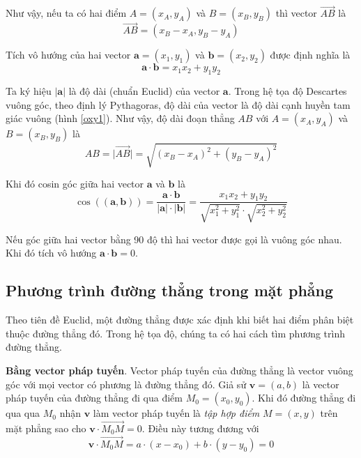 Như vậy, nếu ta có hai điểm $A = (x_A, y_A)$ và $B = (x_B, y_B)$ thì vector $\overrightarrow{AB}$ là
\begin{equation}
	\overrightarrow{AB} = (x_B - x_A, y_B - y_A)
\end{equation}

Tích vô hướng của hai vector $\bm{a} = (x_1, y_1)$ và $\bm{b} = (x_2, y_2)$ được định nghĩa là
\begin{equation}
	\bm{a} \cdot \bm{b} = x_1 x_2 + y_1 y_2
\end{equation}

Ta ký hiệu $\lvert \bm{a} \rvert$ là độ dài (chuẩn Euclid) của vector $\bm{a}$. Trong hệ tọa độ Descartes vuông góc, theo định lý Pythagoras, độ dài của vector là độ dài cạnh huyền tam giác vuông (hình \ref{oxy1}). Như vậy, độ dài đoạn thẳng $AB$ với $A = (x_A, y_A)$ và $B = (x_B, y_B)$ là
\begin{equation}
	AB = \lvert \overrightarrow{AB} \rvert = \sqrt{(x_B - x_A)^2 + (y_B - y_A)^2}
\end{equation}

Khi đó cosin góc giữa hai vector $\bm{a}$ và $\bm{b}$ là
\begin{equation}
	\cos ((\bm{a}, \bm{b})) = \frac{\bm{a} \cdot \bm{b}}{\lvert \bm{a} \rvert \cdot \lvert \bm{b} \rvert} = \frac{x_1 x_2 + y_1 y_2}{\sqrt{x_1^2 + y_1^2} \cdot \sqrt{x_2^2 + y_2^2}}
\end{equation}

Nếu góc giữa hai vector bằng 90 độ thì hai vector được gọi là vuông góc nhau. Khi đó tích vô hướng $\bm{a} \cdot \bm{b} = 0$.

\subsection{Phương trình đường thẳng trong mặt phẳng}

Theo tiên đề Euclid, một đường thẳng được xác định khi biết hai điểm phân biệt thuộc đường thẳng đó. Trong hệ tọa độ, chúng ta có hai cách tìm phương trình đường thẳng.

\textbf{Bằng vector pháp tuyến}. Vector pháp tuyến của đường thẳng là vector vuông góc với mọi vector có phương là đường thẳng đó. Giả sử $\bm{v} = (a, b)$ là vector pháp tuyến của đường thẳng đi qua điểm $M_0 = (x_0, y_0)$. Khi đó đường thẳng đi qua qua $M_0$ nhận $\bm{v}$ làm vector pháp tuyến là \textit{tập hợp điểm} $M = (x, y)$ trên mặt phẳng sao cho $\bm{v} \cdot \overrightarrow{M_0 M} = 0$. Điều này tương đương với
\begin{equation}
	\bm{v} \cdot \overrightarrow{M_0 M} = a \cdot (x - x_0) + b \cdot (y - y_0) = 0
\end{equation}

